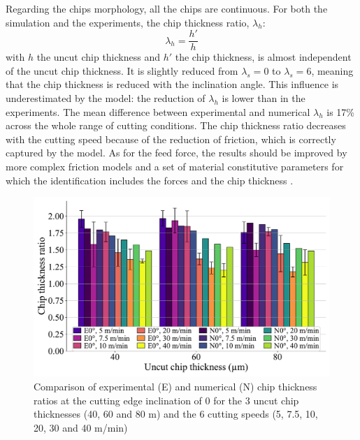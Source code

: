 \documentclass[preprint,12pt,times]{elsarticle}
\begin{document}
Regarding the chips morphology, all the chips are continuous. For both the simulation and the experiments, the chip thickness ratio, $\lambda_h$:
\begin{equation}
\lambda_h = \frac{h'}{h}
\end{equation}
with $h$ the uncut chip thickness and $h'$ the chip thickness, is almost independent of the uncut chip thickness. It is slightly reduced from $\lambda_s = 0$\textdegree{} to $\lambda_s = 6$\textdegree{}, meaning that the chip thickness is reduced with the inclination angle. This influence is underestimated by the model: the reduction of $\lambda_h$ is lower than in the experiments. The mean difference between experimental and numerical $\lambda_h$ is 17\% across the whole range of cutting conditions. The chip thickness ratio decreases with the cutting speed because of the reduction of friction, which is correctly captured by the model. As for the feed force, the results should be improved by more complex friction models and a set of material constitutive parameters for which the identification includes the forces and the chip thickness \cite{kugalurpalanisamy_Identification_2022}.

\begin{figure}[!h]
\centering
\includegraphics[width = 140 mm]{Figures/h0}
\caption{Comparison of experimental (E) and numerical (N) chip thickness ratios at the cutting edge inclination of 0\textdegree{} for the 3 uncut chip thicknesses (40, 60 and 80 \textmu{}m) and the 6 cutting speeds (5, 7.5, 10, 20, 30 and 40 m/min)}
\label{h0}
\end{figure}
\end{document}
